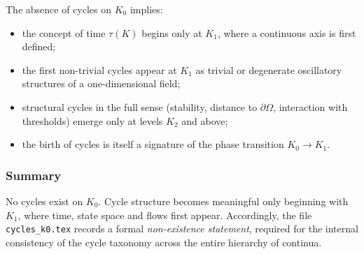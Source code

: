 The absence of cycles on $K_0$ implies:
\begin{itemize}
  \item the concept of time $\tau(K)$ begins only at $K_1$, where a
        continuous axis is first defined;
  \item the first non-trivial cycles appear at $K_1$ as trivial or
        degenerate oscillatory structures of a one-dimensional field;
  \item structural cycles in the full sense (stability, distance to
        $\partial\Omega$, interaction with thresholds) emerge only at
        levels $K_2$ and above;
  \item the birth of cycles is itself a signature of the phase
        transition $K_0\to K_1$.
\end{itemize}

\subsubsection{Summary}

No cycles exist on $K_0$.  
Cycle structure becomes meaningful only beginning with $K_1$, where time,
state space and flows first appear.  
Accordingly, the file \texttt{cycles\_k0.tex} records a formal
\emph{non-existence statement}, required for the internal consistency
of the cycle taxonomy across the entire hierarchy of continua.
